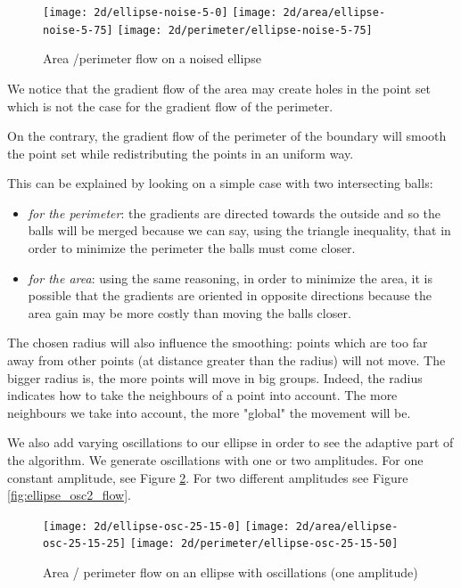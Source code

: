 \begin{figure}[h]
    \centering

    \texttt{[image: 2d/ellipse-noise-5-0]}
    \texttt{[image: 2d/area/ellipse-noise-5-75]}
    \texttt{[image: 2d/perimeter/ellipse-noise-5-75]}
    \caption{Area /perimeter flow on a noised ellipse}

    \label{fig:ellipse_noise_flow}
\end{figure}

We notice that the gradient flow of the area may create holes in the point set
which is not the case for the gradient flow of the perimeter.

On the contrary, the gradient flow of the perimeter of the boundary will smooth
the point set while redistributing the points in an uniform way.

This can be explained by looking on a simple case with two intersecting balls:
\begin{itemize}
    \item \textit{for the perimeter}: the gradients are directed towards the outside
        and so the balls will be merged because we can say, using the triangle
        inequality, that in order to minimize the perimeter the balls must come
        closer.
    \item \textit{for the area}: using the same reasoning, in order to minimize the area,
        it is possible that the gradients are oriented in opposite directions
        because the area gain may be more costly than moving the balls closer.
\end{itemize}

The chosen radius will also influence the smoothing: points which are too far
away from other points (at distance greater than the radius) will not move. The
bigger radius is, the more points will move in big groups. Indeed, the
radius indicates how to take the neighbours of a point into account. The more
neighbours we take into account, the more "global" the movement will be.

We also add varying oscillations to our ellipse in order to see the adaptive
part of the algorithm. We generate oscillations with one or two amplitudes. For
one constant amplitude, see Figure \ref{fig:ellipse_osc_flow}. For two
different amplitudes see Figure \ref{fig:ellipse_osc2_flow}.

\begin{figure}[h]
    \centering

    \texttt{[image: 2d/ellipse-osc-25-15-0]}
    \texttt{[image: 2d/area/ellipse-osc-25-15-25]}
    \texttt{[image: 2d/perimeter/ellipse-osc-25-15-50]}
    \caption{Area / perimeter flow on an ellipse with oscillations (one
        amplitude)}

    \label{fig:ellipse_osc_flow}
\end{figure}

